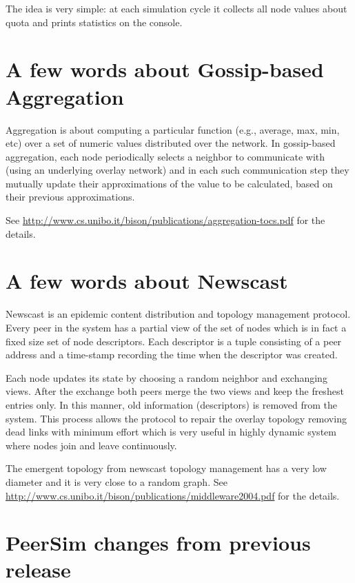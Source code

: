 \documentclass[a4paper,11pt]{article}
\begin{document}
The idea is very simple: at each simulation cycle it collects all
node values about quota and prints statistics on the console.


\appendix
\section{\label{sec:Appendix-A-aggregation}A few words about
Gossip-based Aggregation}


Aggregation is about computing a particular
function (e.g., average, max, min, etc) over a set of numeric values
distributed over the network.
In gossip-based aggregation, each node periodically selects a neighbor
to communicate with (using an underlying overlay network) and
in each such communication step they mutually update their approximations
of the value to be calculated, based on their previous approximations.

See \url{http://www.cs.unibo.it/bison/publications/aggregation-tocs.pdf}
for the details.


\section{\label{sec:Appendix-B-newscast}A few words about Newscast}

Newscast is an epidemic content distribution and topology management
protocol. Every peer in the system has a partial view of
the set of nodes which is in fact a fixed size set of node descriptors.
Each descriptor is a tuple consisting of a peer address and a time-stamp
recording the time when the descriptor was created.

Each node updates its state by choosing a random neighbor and exchanging
views. After the exchange both peers merge the two views and keep the
freshest entries only.
In this manner,
old information (descriptors) is removed from the system.
This process allows the protocol to repair the overlay
topology removing dead links with minimum effort which is very useful
in highly dynamic system where nodes join and leave continuously. 

The emergent topology from newscast topology management has a very
low diameter and it is very close to a random graph.
See \url{http://www.cs.unibo.it/bison/publications/middleware2004.pdf}
for the details.

\section{\label{sec:Appendix-C-changes}PeerSim changes from previous release}
\end{document}
